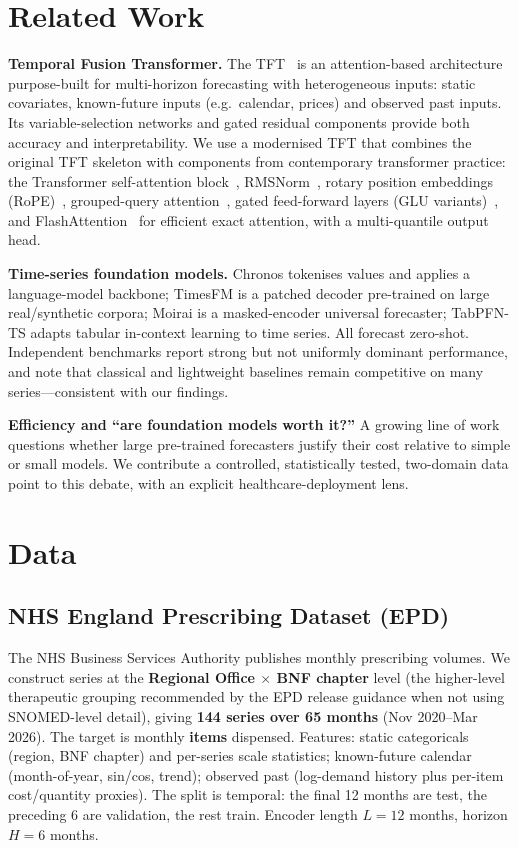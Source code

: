 \documentclass[11pt]{article}
\begin{document}
\section{Related Work}
\textbf{Temporal Fusion Transformer.} The TFT~\cite{tft} is an attention-based architecture
purpose-built for multi-horizon forecasting with heterogeneous inputs: static covariates,
known-future inputs (e.g.\ calendar, prices) and observed past inputs. Its variable-selection
networks and gated residual components provide both accuracy and interpretability. We use a
modernised TFT that combines the original TFT skeleton with components from contemporary
transformer practice: the Transformer self-attention block~\cite{transformer},
RMSNorm~\cite{rmsnorm}, rotary position embeddings (RoPE)~\cite{rope}, grouped-query
attention~\cite{gqa}, gated feed-forward layers (GLU variants)~\cite{glu}, and
FlashAttention~\cite{flash} for efficient exact attention, with a multi-quantile output head.

\textbf{Time-series foundation models.} Chronos tokenises values and applies a language-model
backbone; TimesFM is a patched decoder pre-trained on large real/synthetic corpora; Moirai is
a masked-encoder universal forecaster; TabPFN-TS adapts tabular in-context learning to time
series. All forecast zero-shot. Independent benchmarks report strong but not uniformly
dominant performance, and note that classical and lightweight baselines remain competitive on
many series---consistent with our findings.

\textbf{Efficiency and ``are foundation models worth it?''} A growing line of work questions
whether large pre-trained forecasters justify their cost relative to simple or small models.
We contribute a controlled, statistically tested, two-domain data point to this debate, with
an explicit healthcare-deployment lens.

\section{Data}
\subsection{NHS England Prescribing Dataset (EPD)}
The NHS Business Services Authority publishes monthly prescribing volumes. We construct series
at the \textbf{Regional Office $\times$ BNF chapter} level (the higher-level therapeutic
grouping recommended by the EPD release guidance when not using SNOMED-level detail), giving
\textbf{144 series over 65 months} (Nov 2020--Mar 2026). The target is monthly \textbf{items}
dispensed. Features: static categoricals (region, BNF chapter) and per-series scale
statistics; known-future calendar (month-of-year, sin/cos, trend); observed past (log-demand
history plus per-item cost/quantity proxies). The split is temporal: the final 12 months are
test, the preceding 6 are validation, the rest train. Encoder length $L=12$ months, horizon
$H=6$ months.
\end{document}
